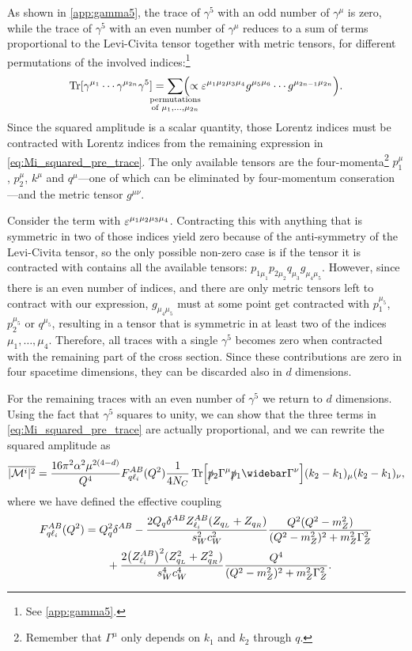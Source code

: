 As shown in \cref{app:gamma5}, the trace of $\gamma^5$ with an odd number of $\gamma^\mu$ is zero, while the trace of $\gamma^5$ with an even number of $\gamma^\mu$ reduces to a sum of terms proportional to the Levi-Civita tensor together with metric tensors, for different permutations of the involved indices:\footnote{See \cref{app:gamma5}.}
\begin{equation}
    \Tr[\gamma^{\mu_1}\cdots\gamma^{\mu_{2n}}\gamma^5] = 
    \sum_{\mathclap{ \substack{\text{permutations} \\ \text{of }\mu_1,\ldots,\mu_{2n}}}} 
    \Bigl(\propto\eps^{\mu_1\mu_2\mu_3\mu_4} g^{\mu_5\mu_6}\cdots g^{\mu_{2n-1}\mu_{2n}}\Bigr).
\end{equation}
Since the squared amplitude is a scalar quantity, those Lorentz indices must be contracted with Lorentz indices from the remaining expression in \cref{eq:Mi_squared_pre_trace}. The only available tensors are the four-momenta\footnote{Remember that $\Gamma^\mu$ only depends on $k_1$ and $k_2$ through $q$.} $p_1^\mu$, $p_2^\mu$, $k^\mu$ and $q^\mu$---one of which can be eliminated by four-momentum conseration---and the metric tensor $g^{\mu\nu}$.

Consider the term with $\varepsilon^{\mu_1\mu_2\mu_3\mu_4}$. Contracting this with anything that is symmetric in two of those indices yield zero because of the anti-symmetry of the Levi-Civita tensor, so the only possible non-zero case is if the tensor it is contracted with contains all the available tensors: $p_{1\mu_1}p_{2\mu_2}q_{\mu_3}g_{\mu_4\mu_5}$. However, since there is an even number of indices, and there are only metric tensors left to contract with our expression, $g_{\mu_4\mu_5}$ must at some point get contracted with $p_1^{\mu_5}$, $p_2^{\mu_5}$ or $q^{\mu_5}$, resulting in a tensor that is symmetric in at least two of the indices $\mu_1,\ldots,\mu_4$. Therefore, all traces with a single $\gamma^5$ becomes zero when contracted with the remaining part of the cross section.
Since these contributions are zero in four spacetime dimensions, they can be discarded also in $d$ dimensions.

For the remaining traces with an even number of $\gamma^5$ we return to $d$ dimensions.
Using the fact that $\gamma^5$ squares to unity, we can show that the three terms in \cref{eq:Mi_squared_pre_trace} are actually proportional, and we can rewrite the squared amplitude as
\begin{align}
    \overline{|\M^i|^2} = \frac{16\pi^2\alpha^2\mu^{2(4-d)}}{Q^4}\fqliab(Q^2) \frac{1}{4\NC} \Tr\Bigl[ \ptwoslash\Gamma^\mu\poneslash\widebar\Gamma^\nu \Bigr] (k_2-k_1)_\mu (k_2-k_1)_\nu, \label{eq:Mi_squared}
\end{align}
where we have defined the effective coupling
\begin{equation}
\begin{split}
    F_{q\ell_i}^{AB}(Q^2) &= Q_q^2\delta^{AB}
    - \frac{2Q_q\delta^{AB}Z_{\ell_i}^{AB}(Z_{q_L}+Z_{q_R})}{s_W^2c_W^2}\frac{Q^2(Q^2-m_Z^2)}{(Q^2-m_Z^2)^2+m_Z^2\Gamma_Z^2}
    \\ &\qquad
    + \frac{2\bigl(Z_{\ell_i}^{AB}\bigr)^2(Z_{q_L}^2+Z_{q_R}^2)}{s_W^4c_W^4}\frac{Q^4}{(Q^2-m_Z^2)^2+m_Z^2\Gamma_Z^2}.
\end{split}
\end{equation}

